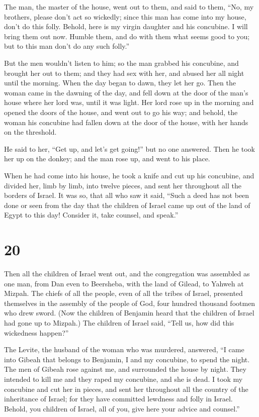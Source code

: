  The man, the master of the house, went out to them, and
said to them, ``No, my brothers, please don't act so wickedly; since
this man has come into my house, don't do this folly. 
Behold, here is my virgin daughter and his concubine. I will bring them
out now. Humble them, and do with them what seems good to you; but to
this man don't do any such folly.''

 But the men wouldn't listen to him; so the man grabbed his
concubine, and brought her out to them; and they had sex with her, and
abused her all night until the morning. When the day began to dawn, they
let her go.  Then the woman came in the dawning of the day,
and fell down at the door of the man's house where her lord was, until
it was light.  Her lord rose up in the morning and opened
the doors of the house, and went out to go his way; and behold, the
woman his concubine had fallen down at the door of the house, with her
hands on the threshold.

 He said to her, ``Get up, and let's get going!'' but no
one answered. Then he took her up on the donkey; and the man rose up,
and went to his place.

 When he had come into his house, he took a knife and cut
up his concubine, and divided her, limb by limb, into twelve pieces, and
sent her throughout all the borders of Israel.  It was so,
that all who saw it said, ``Such a deed has not been done or seen from
the day that the children of Israel came up out of the land of Egypt to
this day! Consider it, take counsel, and speak.''

\hypertarget{section-19}{%
\section{20}\label{section-19}}

 Then all the children of Israel went out, and the
congregation was assembled as one man, from Dan even to Beersheba, with
the land of Gilead, to Yahweh at Mizpah.  The chiefs of all
the people, even of all the tribes of Israel, presented themselves in
the assembly of the people of God, four hundred thousand footmen who
drew sword.  (Now the children of Benjamin heard that the
children of Israel had gone up to Mizpah.) The children of Israel said,
``Tell us, how did this wickedness happen?''

 The Levite, the husband of the woman who was murdered,
answered, ``I came into Gibeah that belongs to Benjamin, I and my
concubine, to spend the night.  The men of Gibeah rose
against me, and surrounded the house by night. They intended to kill me
and they raped my concubine, and she is dead.  I took my
concubine and cut her in pieces, and sent her throughout all the country
of the inheritance of Israel; for they have committed lewdness and folly
in Israel.  Behold, you children of Israel, all of you, give
here your advice and counsel.''


